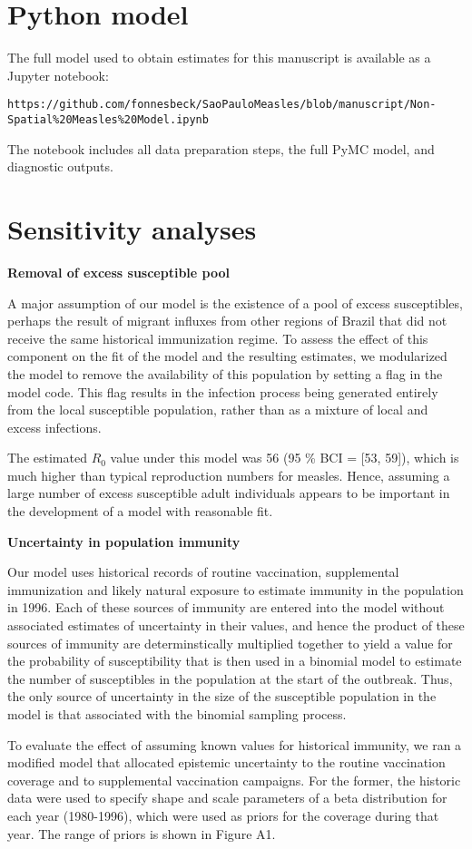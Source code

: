 \appendix

\section{Python model}

The full model used to obtain estimates for this manuscript is available as a Jupyter notebook:

\verb|https://github.com/fonnesbeck/SaoPauloMeasles/blob/manuscript/Non-Spatial%20Measles%20Model.ipynb|

The notebook includes all data preparation steps, the full PyMC model, and diagnostic outputs.

\section{Sensitivity analyses}

\textbf{Removal of excess susceptible pool}

A major assumption of our model is the existence of a pool of excess susceptibles, perhaps the result of migrant influxes from other regions of Brazil that did not receive the same historical immunization regime. To assess the effect of this component on the fit of the model and the resulting estimates, we modularized the model to remove the availability of this population by setting a flag in the model code. This flag results in the infection process being generated entirely from the local susceptible population, rather than as a mixture of local and excess infections.

The estimated $R_0$ value under this model was 56 (95 \% BCI = [53, 59]), which is much higher than typical reproduction numbers for measles\cite{Durrheim_2014}. Hence, assuming a large number of excess susceptible adult individuals appears to be important in the development of a model with reasonable fit.

\textbf{Uncertainty in population immunity}

Our model uses historical records of routine vaccination, supplemental immunization and likely natural exposure to estimate immunity in the population in 1996. Each of these sources of immunity are entered into the model without associated estimates of uncertainty in their values, and hence the product of these sources of immunity are determinstically multiplied together to yield a value for the probability of susceptibility that is then used in a binomial model to estimate the number of susceptibles in the population at the start of the outbreak. Thus, the only source of uncertainty in the size of the susceptible population in the model is that associated with the binomial sampling process.

To evaluate the effect of assuming known values for historical immunity, we ran a modified model that allocated epistemic uncertainty to the routine vaccination coverage and to supplemental vaccination campaigns. For the former, the historic data were used to specify shape and scale parameters of a beta distribution for each year (1980-1996), which were used as priors for the coverage during that year. The range of priors is shown in Figure A1.